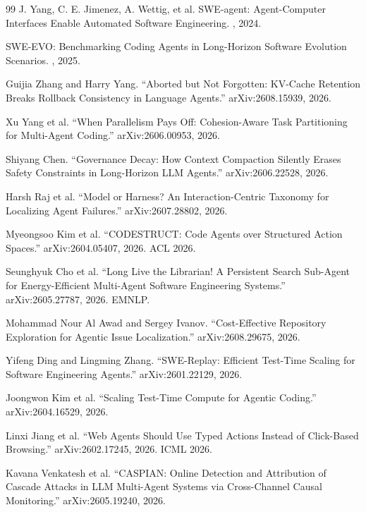 \documentclass[11pt]{book}
\begin{document}
\begin{thebibliography}{99}
J. Yang, C. E. Jimenez, A. Wettig, et al.
\newblock SWE-agent: Agent-Computer Interfaces Enable Automated Software Engineering.
, 2024.

\newblock SWE-EVO: Benchmarking Coding Agents in Long-Horizon Software Evolution Scenarios.
, 2025.

Guijia Zhang and Harry Yang.
``Aborted but Not Forgotten: KV-Cache Retention Breaks Rollback Consistency in Language Agents.''
arXiv:2608.15939, 2026.

Xu Yang et al.
``When Parallelism Pays Off: Cohesion-Aware Task Partitioning for Multi-Agent Coding.''
arXiv:2606.00953, 2026.

Shiyang Chen.
``Governance Decay: How Context Compaction Silently Erases Safety Constraints in Long-Horizon LLM Agents.''
arXiv:2606.22528, 2026.

Harsh Raj et al.
``Model or Harness? An Interaction-Centric Taxonomy for Localizing Agent Failures.''
arXiv:2607.28802, 2026.

Myeongsoo Kim et al.
``CODESTRUCT: Code Agents over Structured Action Spaces.''
arXiv:2604.05407, 2026. ACL 2026.

Seunghyuk Cho et al.
``Long Live the Librarian! A Persistent Search Sub-Agent for Energy-Efficient Multi-Agent Software Engineering Systems.''
arXiv:2605.27787, 2026. EMNLP.

Mohammad Nour Al Awad and Sergey Ivanov.
``Cost-Effective Repository Exploration for Agentic Issue Localization.''
arXiv:2608.29675, 2026.

Yifeng Ding and Lingming Zhang.
``SWE-Replay: Efficient Test-Time Scaling for Software Engineering Agents.''
arXiv:2601.22129, 2026.

Joongwon Kim et al.
``Scaling Test-Time Compute for Agentic Coding.''
arXiv:2604.16529, 2026.

Linxi Jiang et al.
``Web Agents Should Use Typed Actions Instead of Click-Based Browsing.''
arXiv:2602.17245, 2026. ICML 2026.

Kavana Venkatesh et al.
``CASPIAN: Online Detection and Attribution of Cascade Attacks in LLM Multi-Agent Systems via Cross-Channel Causal Monitoring.''
arXiv:2605.19240, 2026.


\end{thebibliography}
\end{document}
